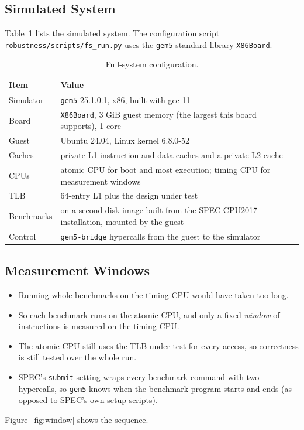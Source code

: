 \subsection{Simulated System}
Table~\ref{tab:fs_setup} lists the simulated system. The configuration script \texttt{robustness/scripts/fs\_run.py} uses the \texttt{gem5} standard library \texttt{X86Board}.

\begin{table}[htbp]
\centering
\small
\caption{Full-system configuration.}
\label{tab:fs_setup}
\begin{tabularx}{\textwidth}{l X}
\toprule
\textbf{Item} & \textbf{Value} \\
\midrule
Simulator & \texttt{gem5} 25.1.0.1, x86, built with gcc-11 \\
Board & \texttt{X86Board}, 3 GiB guest memory (the largest this board supports), 1 core \\
Guest & Ubuntu 24.04, Linux kernel 6.8.0-52 \\
Caches & private L1 instruction and data caches and a private L2 cache \\
CPUs & atomic CPU for boot and most execution; timing CPU for measurement windows \\
TLB & 64-entry L1 plus the design under test \\
Benchmarks & on a second disk image built from the SPEC CPU2017 installation, mounted by the guest \\
Control & \texttt{gem5-bridge} hypercalls from the guest to the simulator \\
\bottomrule
\end{tabularx}
\end{table}

\subsection{Measurement Windows}
\begin{itemize}
    \item Running whole benchmarks on the timing CPU would have taken too long.
    \item So each benchmark runs on the atomic CPU, and only a fixed \emph{window} of instructions is measured on the timing CPU.
    \item The atomic CPU still uses the TLB under test for every access, so correctness is still tested over the whole run.
    \item SPEC's \texttt{submit} setting wraps every benchmark command with two hypercalls, so \texttt{gem5} knows when the benchmark program starts and ends (as opposed to SPEC's own setup scripts).
\end{itemize}
Figure~\ref{fig:window} shows the sequence.

